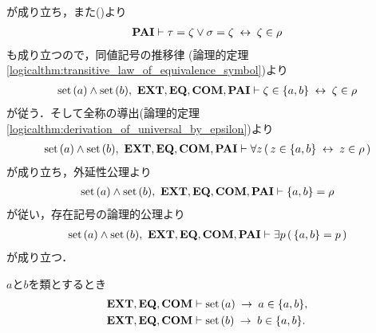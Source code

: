 \begin{sketch}
\begin{description}
				が成り立ち，また()より
				\begin{align}
					\PAIAX \vdash \tau = \zeta \vee \sigma = \zeta \lrarrow \zeta \in \rho
				\end{align}
				も成り立つので，同値記号の推移律
				(論理的定理\ref{logicalthm:transitive_law_of_equivalence_symbol})より
				\begin{align}
					\set{a} \wedge \set{b},\ \EXTAX,\EQAX,\COMAX,\PAIAX \vdash 
					\zeta \in \{a,b\} \lrarrow \zeta \in \rho
				\end{align}
				が従う．そして全称の導出(論理的定理\ref{logicalthm:derivation_of_universal_by_epsilon})より
				\begin{align}
					\set{a} \wedge \set{b},\ \EXTAX,\EQAX,\COMAX,\PAIAX \vdash 
					\forall z\, (\, z \in \{a,b\} \lrarrow z \in \rho\, )
				\end{align}
				が成り立ち，外延性公理より
				\begin{align}
					\set{a} \wedge \set{b},\ \EXTAX,\EQAX,\COMAX,\PAIAX \vdash 
					\{a,b\} = \rho
				\end{align}
				が従い，存在記号の論理的公理より
				\begin{align}
					\set{a} \wedge \set{b},\ \EXTAX,\EQAX,\COMAX,\PAIAX \vdash 
					\exists p\, (\, \{a,b\} = p\, )
				\end{align}
				が成り立つ．
				\QED
		\end{description}
	\end{sketch}
	
	\begin{screen}
		\begin{thm}[集合は自分自身の対の要素である]
		\label{thm:set_is_an_element_of_its_pair}
			$a$と$b$を類とするとき
			\begin{align}
				\EXTAX,\EQAX,\COMAX &\vdash \set{a} \rarrow a \in \{a,b\}, \\
				\EXTAX,\EQAX,\COMAX &\vdash \set{b} \rarrow b \in \{a,b\}.
			\end{align}
		\end{thm}
	\end{screen}
	
